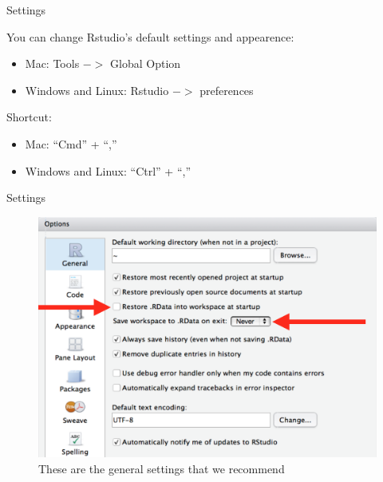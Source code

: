 \documentclass[ignorenonframetext,]{beamer}
\providecommand{\tightlist}{%
  \setlength{\itemsep}{0pt}\setlength{\parskip}{0pt}}
\begin{document}
\begin{frame}{Settings}
\protect\hypertarget{settings}{}

You can change Rstudio's default settings and appearence:

\begin{itemize}
\tightlist
\item
  Mac: Tools \(->\) Global Option
\item
  Windows and Linux: Rstudio \(->\) preferences
\end{itemize}

Shortcut:

\begin{itemize}
\tightlist
\item
  Mac: ``Cmd'' + ``,''
\item
  Windows and Linux: ``Ctrl'' + ``,''
\end{itemize}

\end{frame}

\begin{frame}{Settings}
\protect\hypertarget{settings-1}{}

\begin{figure}
   \includegraphics[scale = .3]{figures/settings.png}
   \caption{These are the general settings that we recommend}
\end{figure}

\end{frame}
\end{document}
